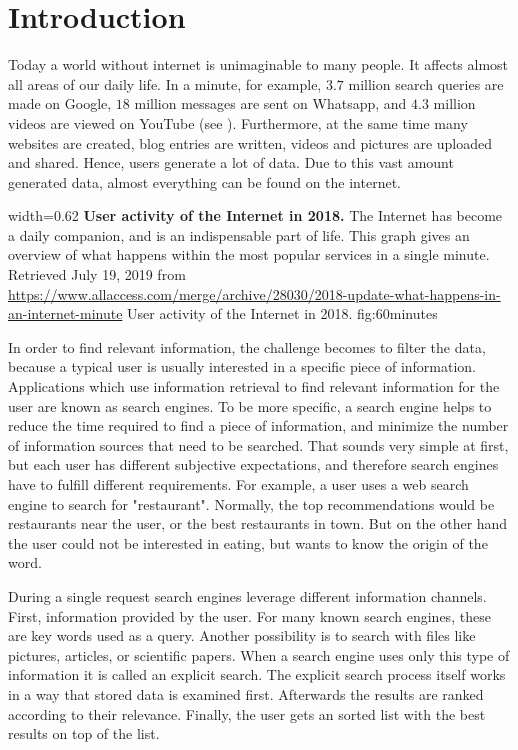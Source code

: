 \chapter{Introduction}
\label{cha:introduction}

Today a world without internet is unimaginable to many people. It affects almost all areas of our daily life. In a minute, for example, $3.7$ million search queries are made on Google, $18$ million messages are sent on Whatsapp, and $4.3$ million videos are viewed on YouTube (see ). Furthermore, at the same time many websites are created, blog entries are written, videos and pictures are uploaded and shared. Hence, users generate a lot of data. Due to this vast amount generated data, almost everything can be found on the internet.

      {width=0.62\textwidth}
      {\textbf{User activity of the Internet in 2018.} The Internet has become a daily companion, and is an indispensable part of life. This graph gives an overview of what happens within the most popular services in a single minute. Retrieved July 19, 2019 from \url{https://www.allaccess.com/merge/archive/28030/2018-update-what-happens-in-an-internet-minute}}
      {User activity of the Internet in 2018.}
      {fig:60minutes}

In order to find relevant information, the challenge becomes to filter the data, because a typical user is usually interested in a specific piece of information. Applications which use information retrieval to find relevant information for the user are known as search engines. To be more specific, a search engine helps to reduce the time required to find a piece of information, and minimize the number of information sources that need to be searched. That sounds very simple at first, but each user has different subjective expectations, and therefore search engines have to fulfill different requirements. For example, a user uses a web search engine to search for "restaurant". Normally, the top recommendations would be restaurants near the user, or the best restaurants in town. But on the other hand the user could not be interested in eating, but wants to know the origin of the word.

During a single request search engines leverage different information channels. First, information provided by the user. For many known search engines, these are key words used as a query. Another possibility is to search with files like pictures, articles, or scientific papers. When a search engine uses only this type of information it is called an explicit search. The explicit search process itself works in a way that stored data is examined first. Afterwards the results are ranked according to their relevance. Finally, the user gets an sorted list with the best results on top of the list.

